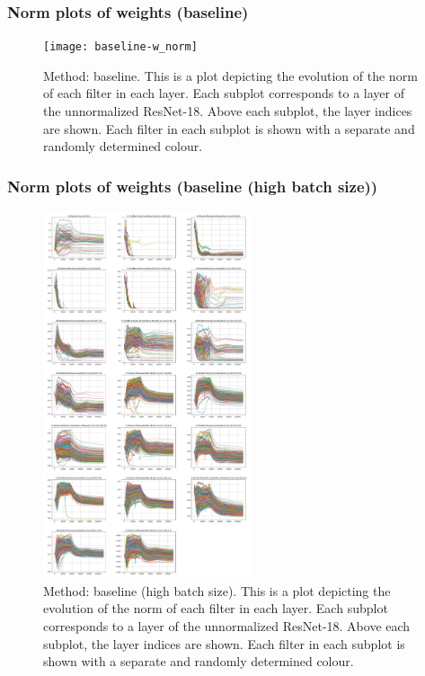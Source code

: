 \documentclass[times,sort&compress]{elsarticle}
\begin{document}
\newpage \subsubsection{Norm plots of weights (baseline)} \begin{figure}[h] \centering
\texttt{[image: baseline-w\_norm]} \caption{ Method: baseline. This
is a plot depicting the evolution of the norm of each filter in each layer. Each subplot
corresponds to a layer of the unnormalized ResNet-18. Above each subplot, the layer
indices are shown. Each filter in each subplot is shown with a separate and randomly
determined colour. } \end{figure}

\newpage \subsubsection{Norm plots of weights (baseline (high batch size))}
\begin{figure}[h] \centering
\includegraphics[width=0.55\textwidth]{baseline_high_bs-w_norm} \caption{ Method:
baseline (high batch size). This is a plot depicting the evolution of the norm of each
filter in each layer. Each subplot corresponds to a layer of the unnormalized ResNet-18.
Above each subplot, the layer indices are shown. Each filter in each subplot is shown
with a separate and randomly determined colour. } \end{figure}
\end{document}
